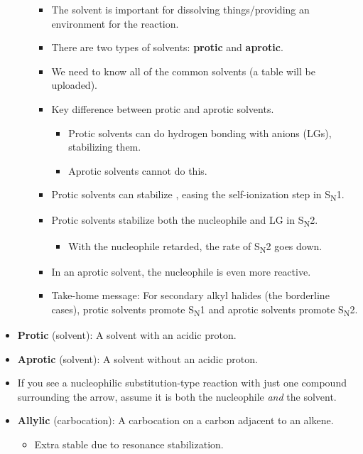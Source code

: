 \documentclass[../notes.tex]{subfiles}
\begin{document}
\begin{itemize}
\begin{enumerate}
\begin{itemize}
            \item The solvent is important for dissolving things/providing an environment for the reaction.
            \item There are two types of solvents: \textbf{protic} and \textbf{aprotic}.
            \item We need to know all of the common solvents (a table will be uploaded).
            \item Key difference between protic and aprotic solvents.
            \begin{itemize}
                \item Protic solvents can do hydrogen bonding with anions (LGs), stabilizing them.
                \item Aprotic solvents cannot do this.
            \end{itemize}
            \item Protic solvents can stabilize , easing the self-ionization step in S\textsubscript{N}1.
            \item Protic solvents stabilize both the nucleophile and LG in S\textsubscript{N}2.
            \begin{itemize}
                \item With the nucleophile retarded, the rate of S\textsubscript{N}2 goes down.
            \end{itemize}
            \item In an aprotic solvent, the nucleophile is even more reactive.
            \item Take-home message: For secondary alkyl halides (the borderline cases), protic solvents promote S\textsubscript{N}1 and aprotic solvents promote S\textsubscript{N}2.
        \end{itemize}
    \end{enumerate}
    \item \textbf{Protic} (solvent): A solvent with an acidic proton.
    \item \textbf{Aprotic} (solvent): A solvent without an acidic proton.
    \item If you see a nucleophilic substitution-type reaction with just one compound surrounding the arrow, assume it is both the nucleophile \emph{and} the solvent.
    \item \textbf{Allylic} (carbocation): A carbocation on a carbon adjacent to an alkene.
    \begin{itemize}
        \item Extra stable due to resonance stabilization.
    \end{itemize}
\end{itemize}
\end{document}
